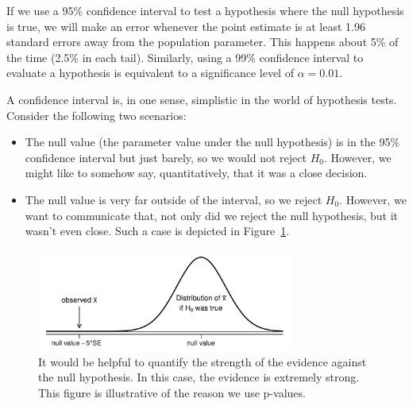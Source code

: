 If we use a 95\% confidence interval to test a hypothesis where the null hypothesis is true, we will make an error whenever the point estimate is at least 1.96 standard errors away from the population parameter. This happens about 5\% of the time (2.5\% in each tail). Similarly, using a 99\% confidence interval to evaluate a hypothesis is equivalent to a significance level of $\alpha = 0.01$.

A confidence interval is, in one sense, simplistic in the world of hypothesis tests. Consider the following two scenarios:
\begin{itemize}
\setlength{\itemsep}{0mm}
\item The null value (the parameter value under the null hypothesis) is in the 95\% confidence interval but just barely, so we would not reject $H_0$. However, we might like to somehow say, quantitatively, that it was a close decision.
\item The null value is very far outside of the interval, so we reject $H_0$. However, we want to communicate that, not only did we reject the null hypothesis, but it wasn't even close. Such a case is depicted in Figure~\ref{whyWeWantPValue}.
\end{itemize}

\begin{figure}[H]
\centering
\captionsetup{width=0.9\textwidth}
\includegraphics[width=0.75\textwidth]{04/figures/whyWeWantPValue/whyWeWantPValue}
\caption{It would be helpful to quantify the strength of the evidence against the null hypothesis. In this case, the evidence is extremely strong.
This figure is illustrative of the reason we use p-values.}
\label{whyWeWantPValue}
\end{figure}










